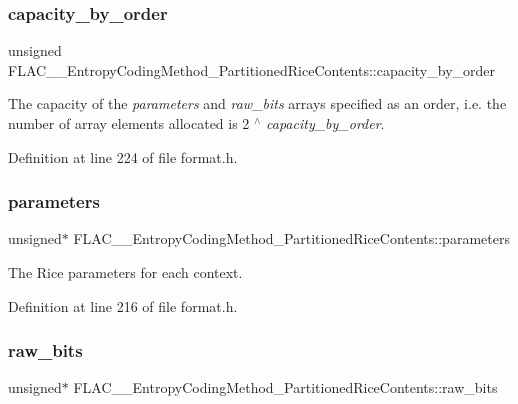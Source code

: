 \subsubsection{\texorpdfstring{capacity\_by\_order}{capacity\_by\_order}}
{\footnotesize\ttfamily unsigned F\+L\+A\+C\+\_\+\+\_\+\+Entropy\+Coding\+Method\+\_\+\+Partitioned\+Rice\+Contents\+::capacity\+\_\+by\+\_\+order}

The capacity of the {\itshape parameters} and {\itshape raw\+\_\+bits} arrays specified as an order, i.\+e. the number of array elements allocated is 2 $^\wedge$ {\itshape capacity\+\_\+by\+\_\+order}. 

Definition at line 224 of file format.\+h.

\mbox{\label{struct_f_l_a_c_____entropy_coding_method___partitioned_rice_contents_a06e97d40923f195410a65da9311ab6a2}} 
\subsubsection{\texorpdfstring{parameters}{parameters}}
{\footnotesize\ttfamily unsigned$\ast$ F\+L\+A\+C\+\_\+\+\_\+\+Entropy\+Coding\+Method\+\_\+\+Partitioned\+Rice\+Contents\+::parameters}

The Rice parameters for each context. 

Definition at line 216 of file format.\+h.

\mbox{\label{struct_f_l_a_c_____entropy_coding_method___partitioned_rice_contents_a915eb5369d39924bc29c948c29834279}} 
\subsubsection{\texorpdfstring{raw\_bits}{raw\_bits}}
{\footnotesize\ttfamily unsigned$\ast$ F\+L\+A\+C\+\_\+\+\_\+\+Entropy\+Coding\+Method\+\_\+\+Partitioned\+Rice\+Contents\+::raw\+\_\+bits}

